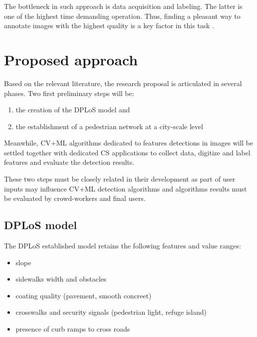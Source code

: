 \documentclass[10pt,conference,a4paper]{IEEEtran}
\begin{document}
The bottleneck in such approach is data acquisition and labeling. The latter is one of the highest time demanding operation. Thus, finding a pleasant way to annotate images with the highest quality is a key factor in this task \cite{von2006peekaboom}.






\section{Proposed approach}
Based on the relevant literature, the research proposal is articulated in several phases.
Two first preliminary steps will be:
\begin{enumerate}\setlength\itemsep{0.0em}
\item the creation of the DPLoS model and
\item the establishment of a pedestrian network at a city-scale level %
\end{enumerate}  

Meanwhile, CV+ML algorithms dedicated to features detections in images will be settled together with dedicated CS applications to collect data, digitize and label features and evaluate the detection results.

These two steps must be closely related in their development as part of user inputs may influence CV+ML detection algorithms and algorithms results must be evaluated by crowd-workers and final users. 

\subsection{DPLoS model}
The DPLoS established model retains the following features and value ranges:
\begin{itemize}
\item slope
\item sidewalks width and obstacles
\item coating quality (pavement, smooth concreet)
\item crosswalks and security signals (pedestrian light, refuge island)
\item presence of curb ramps to cross roads
\end{itemize}
\end{document}

